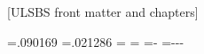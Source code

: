 %
%

[ULSBS front matter and chapters]



\newlength\ulCoverPermanentIconSize\ulCoverPermanentIconSize=.090169\textwidth%
\newlength\ulCoverPermanentIconGap\ulCoverPermanentIconGap=.021286\textwidth%
\newlength\ulCoverVariableIconSize\ulCoverVariableIconSize=\ulCoverPermanentIconSize
\newlength\ulCoverVariableIconGap\ulCoverVariableIconGap=\ulCoverPermanentIconGap
\newlength\ulCoverIconLeftOffset\ulCoverIconLeftOffset=\dimexpr-\parindent\relax%
\newlength\ulCoverIconTopOffset\ulCoverIconTopOffset=\dimexpr-\topskip-\headsep-\headheight\relax%


